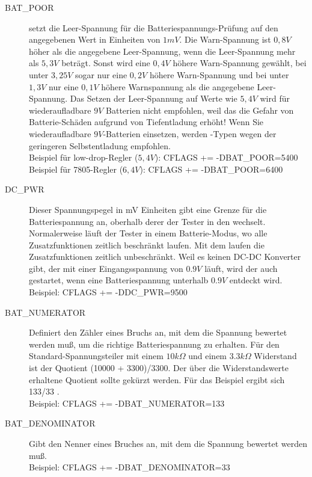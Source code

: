 \begin{description}
  \item[BAT\_POOR] setzt die Leer-Spannung für die Batteriespannungs-Prüfung auf den angegebenen Wert in Einheiten von \(1mV\).
Die Warn-Spannung ist \(0,8V\) höher als die angegebene Leer-Spannung, wenn die Leer-Spannung mehr als \(5,3V\) beträgt.
Sonst wird eine \(0,4V\) höhere Warn-Spannung gewählt, bei unter \(3,25V\) sogar nur eine \(0,2V\) höhere Warn-Spannung und
bei unter \(1,3V\) nur eine \(0,1V\) höhere Warnspannung als die angegebene Leer-Spannung.
Das Setzen der Leer-Spannung auf Werte wie \(5,4V\) wird für wiederaufladbare \(9V\) Batterien nicht empfohlen,
weil das die Gefahr von Batterie-Schäden aufgrund von Tiefentladung erhöht!
Wenn Sie wiederaufladbare \(9V\)-Batterien einsetzen, werden -Typen wegen der geringeren Selbstentladung empfohlen.\\
Beispiel für low-drop-Regler (\(5,4V\)): CFLAGS += -DBAT\_POOR=5400 \\
Beispiel für 7805-Regler (\(6,4V\)): CFLAGS += -DBAT\_POOR=6400

  \item[DC\_PWR] Dieser Spannungspegel in mV Einheiten gibt eine Grenze für die Batteriespannung an, oberhalb
  derer der Tester in den  wechselt. Normalerweise läuft der Tester in einem Batterie-Modus,
wo alle Zusatzfunktionen zeitlich beschränkt laufen.
Mit dem  laufen die Zusatzfunktionen zeitlich unbeschränkt.
Weil es keinen DC-DC Konverter gibt, der mit einer Eingangsspannung von \(0.9V\) läuft,
wird der  auch gestartet, wenn eine Batteriespannung unterhalb \(0.9V\) entdeckt wird.\\
Beispiel: CFLAGS += -DDC\_PWR=9500

 \item[BAT\_NUMERATOR] Definiert den Zähler eines Bruchs an, mit dem die Spannung bewertet werden muß,
um die richtige Batteriespannung zu erhalten. Für den Standard-Spannungsteiler mit einem \(10 k\Omega\) und 
einem \(3.3 k\Omega\) Widerstand ist der Quotient (10000 + 3300)/3300. 
Der über die Widerstandswerte erhaltene Quotient sollte gekürzt werden. 
Für das Beispiel ergibt sich 133/33 .\\
Beispiel: CFLAGS += -DBAT\_NUMERATOR=133

 \item[BAT\_DENOMINATOR] Gibt den Nenner eines Bruches an, mit dem die Spannung bewertet werden muß.\\
Beispiel: CFLAGS += -DBAT\_DENOMINATOR=33


\end{description}
